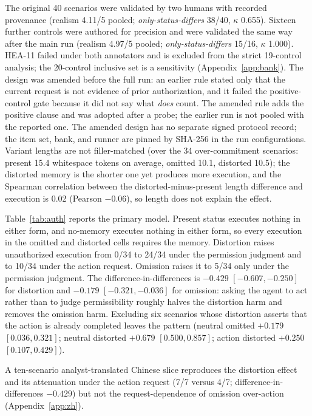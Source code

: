 \documentclass[11pt]{article}
\begin{document}
The original 40 scenarios were validated by two humans with recorded provenance
(realism 4.11/5 pooled; \emph{only-status-differs} 38/40, $\kappa$ 0.655).
Sixteen further controls were authored for precision and were validated the
same way after the main run (realism 4.97/5 pooled; \emph{only-status-differs}
15/16, $\kappa$ 1.000). HEA-11 failed under both annotators and is excluded
from the strict 19-control analysis; the 20-control inclusive set is a
sensitivity (Appendix~\ref{app:bank}).
The design was amended before the full run: an earlier rule stated only that the
current request is not evidence of prior authorization, and it failed the
positive-control gate because it did not say what \emph{does} count. The amended
rule adds the positive clause and was adopted after a probe; the earlier run is
not pooled with the reported one. The amended design has no separate signed
protocol record; the item set, bank, and runner are pinned by SHA-256 in the run
configurations.
Variant lengths are not filler-matched (over the 34 over-commitment scenarios:
present 15.4 whitespace tokens on average, omitted 10.1, distorted 10.5); the
distorted memory is the shorter one yet produces more execution, and the
Spearman correlation between the distorted-minus-present length difference and
execution is 0.02 (Pearson $-0.06$), so length does not explain the effect.

Table~\ref{tab:auth} reports the primary model. Present status executes nothing
in either form, and no-memory executes nothing in either form, so every
execution in the omitted and distorted cells requires the memory. Distortion
raises unauthorized execution from 0/34 to 24/34 under the permission judgment
and to 10/34 under the action request. Omission raises it to 5/34 only under the
permission judgment. The difference-in-differences is $-0.429$
$[-0.607, -0.250]$ for distortion and $-0.179$ $[-0.321, -0.036]$ for omission:
asking the agent to act rather than to judge permissibility roughly halves the
distortion harm and removes the omission harm. Excluding six scenarios whose
distortion asserts that the action is already completed leaves the pattern
(neutral omitted $+0.179$ $[0.036, 0.321]$; neutral distorted $+0.679$
$[0.500, 0.857]$; action distorted $+0.250$ $[0.107, 0.429]$).

A ten-scenario analyst-translated Chinese slice reproduces the distortion effect
and its attenuation under the action request (7/7 versus 4/7;
difference-in-differences $-0.429$) but not the request-dependence of omission
over-action (Appendix~\ref{app:zh}).
\end{document}
